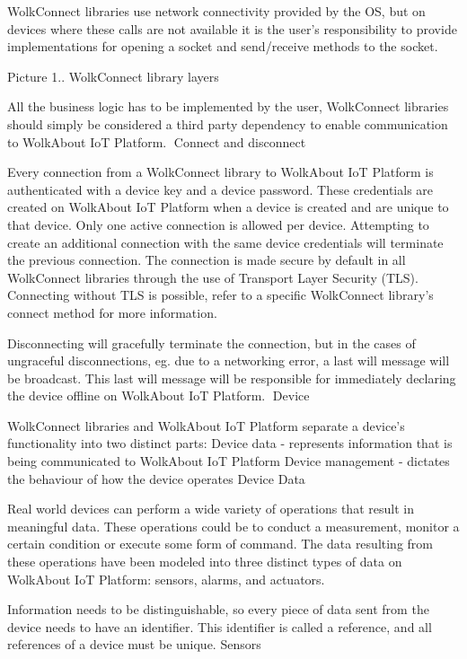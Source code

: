 Wolk\+Connect libraries use network connectivity provided by the OS, but on devices where these calls are not available it is the user’s responsibility to provide implementations for opening a socket and send/receive methods to the socket.

Picture 1.. Wolk\+Connect library layers

All the business logic has to be implemented by the user, Wolk\+Connect libraries should simply be considered a third party dependency to enable communication to Wolk\+About IoT Platform. Connect and disconnect

Every connection from a Wolk\+Connect library to Wolk\+About IoT Platform is authenticated with a device key and a device password. These credentials are created on Wolk\+About IoT Platform when a device is created and are unique to that device. Only one active connection is allowed per device. Attempting to create an additional connection with the same device credentials will terminate the previous connection. The connection is made secure by default in all Wolk\+Connect libraries through the use of Transport Layer Security (T\+LS). Connecting without T\+LS is possible, refer to a specific Wolk\+Connect library’s connect method for more information.

Disconnecting will gracefully terminate the connection, but in the cases of ungraceful disconnections, eg. due to a networking error, a last will message will be broadcast. This last will message will be responsible for immediately declaring the device offline on Wolk\+About IoT Platform. Device

Wolk\+Connect libraries and Wolk\+About IoT Platform separate a device’s functionality into two distinct parts\+: Device data -\/ represents information that is being communicated to Wolk\+About IoT Platform Device management -\/ dictates the behaviour of how the device operates Device Data

Real world devices can perform a wide variety of operations that result in meaningful data. These operations could be to conduct a measurement, monitor a certain condition or execute some form of command. The data resulting from these operations have been modeled into three distinct types of data on Wolk\+About IoT Platform\+: sensors, alarms, and actuators.

Information needs to be distinguishable, so every piece of data sent from the device needs to have an identifier. This identifier is called a reference, and all references of a device must be unique. Sensors

